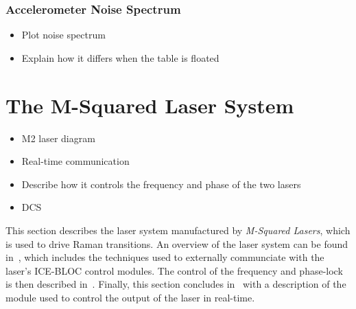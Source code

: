 \subsubsection{Accelerometer Noise Spectrum}
\begin{itemize}
	\item Plot noise spectrum
	\item Explain how it differs when the table is floated
\end{itemize}
\section{The M-Squared Laser System}\label{sec:msquared_laser} \begin{itemize}
  \item M2 laser diagram \item Real-time communication \item Describe how it
  controls the frequency and phase of the two lasers \item DCS \end{itemize}
  This section describes the laser system manufactured by \textit{M-Squared
  Lasers}, which is used to drive Raman transitions. An overview of the laser
  system can be found in~, which includes
  the techniques used to externally communciate with the laser's ICE-BLOC
  control modules. The control of the frequency and phase-lock is then described
  in~. Finally, this section concludes
  in~ with a description of the module used to control
  the output of the laser in real-time.
